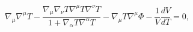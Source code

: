 \begin{equation}
\nabla_\mu\nabla^\mu T
-\frac{\nabla_\mu \nabla_\nu T\nabla^\mu T\nabla^\nu T}
 {1+\nabla_\alpha T\nabla^\alpha T}
-\nabla_\mu T\nabla^\mu\Phi
-\frac{1}{V}\frac{dV}{dT}=0,
\label{tachyon1}
\end{equation}

